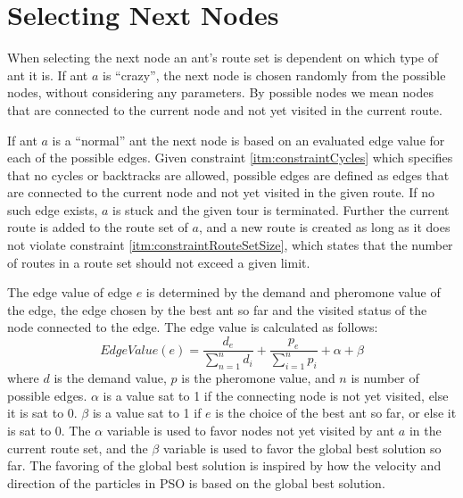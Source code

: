\section{Selecting Next Nodes}
\label{sec:selectingNextNode}

When selecting the next node an ant's route set is dependent on which type of ant it is. If ant $a$ is ``crazy'', the next node is chosen randomly from the possible nodes, without considering any parameters. By possible nodes we mean nodes that are connected to the current node and not yet visited in the current route.

If ant $a$ is a ``normal'' ant the next node is based on an evaluated edge value for each of the possible edges. Given constraint \vref{itm:constraintCycles} which specifies that no cycles or backtracks are allowed, possible edges are defined as edges that are connected to the current node and not yet visited in the given route. If no such edge exists, $a$ is stuck and the given tour is terminated. Further the current route is added to the route set of $a$, and a new route is created as long as it does not violate constraint \vref{itm:constraintRouteSetSize}, which states that the number of routes in a route set should not exceed a given limit. 

The edge value of edge $e$ is determined by the demand and pheromone value of the edge, the edge chosen by the best ant so far and the visited status of the node connected to the edge. The edge value is calculated as follows: 
\newline
$$EdgeValue(e) = \frac{d_e}{\sum\limits^{n}_{n=1}d_i} + \frac{p_e}{\sum\limits^{n}_{i=1}p_i} + \alpha + \beta$$
\newline
where $d$ is the demand value, $p$ is the pheromone value, and $n$ is number of possible edges. $\alpha$ is a value sat to 1 if the connecting node is not yet visited, else it is sat to 0. $\beta$ is a value sat to 1 if $e$ is the choice of the best ant so far, or else it is sat to 0. The $\alpha$ variable is used to favor nodes not yet visited by ant $a$ in the current route set, and the $\beta$ variable is used to favor the global best solution so far. The favoring of the global best solution is inspired by how the velocity and direction of the particles in PSO is based on the global best solution. 

